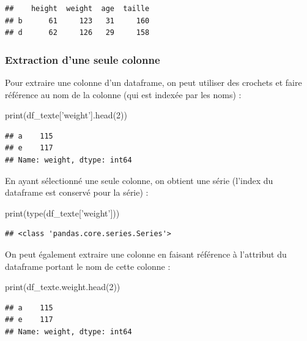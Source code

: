 \documentclass[12pt,]{book}
\newenvironment{Shaded}{\begin{snugshade}}{\end{snugshade}}
\newcommand{\DecValTok}[1]{\textcolor[rgb]{0.00,0.00,0.81}{#1}}
\newcommand{\StringTok}[1]{\textcolor[rgb]{0.31,0.60,0.02}{#1}}
\newcommand{\BuiltInTok}[1]{#1}
\newcommand{\NormalTok}[1]{#1}
\numberwithin{equation}{section}
\numberwithin{countremarque}{section}
\begin{document}
\begin{lstlisting}
##    height  weight  age  taille
## b      61     123   31     160
## d      62     126   29     158
\end{lstlisting}

\subsubsection{Extraction d'une seule
colonne}\label{extraction-dune-seule-colonne}

Pour extraire une colonne d'un dataframe, on peut utiliser des crochets
et faire référence au nom de la colonne (qui est indexée par les noms) :

\begin{Shaded}
\begin{Highlighting}[]
\BuiltInTok{print}\NormalTok{(df_texte[}\StringTok{'weight'}\NormalTok{].head(}\DecValTok{2}\NormalTok{))}
\end{Highlighting}
\end{Shaded}

\begin{lstlisting}
## a    115
## e    117
## Name: weight, dtype: int64
\end{lstlisting}

En ayant sélectionné une seule colonne, on obtient une série (l'index du
dataframe est conservé pour la série) :

\begin{Shaded}
\begin{Highlighting}[]
\BuiltInTok{print}\NormalTok{(}\BuiltInTok{type}\NormalTok{(df_texte[}\StringTok{'weight'}\NormalTok{]))}
\end{Highlighting}
\end{Shaded}

\begin{lstlisting}
## <class 'pandas.core.series.Series'>
\end{lstlisting}

On peut également extraire une colonne en faisant référence à l'attribut
du dataframe portant le nom de cette colonne :

\begin{Shaded}
\begin{Highlighting}[]
\BuiltInTok{print}\NormalTok{(df_texte.weight.head(}\DecValTok{2}\NormalTok{))}
\end{Highlighting}
\end{Shaded}

\begin{lstlisting}
## a    115
## e    117
## Name: weight, dtype: int64
\end{lstlisting}
\end{document}
